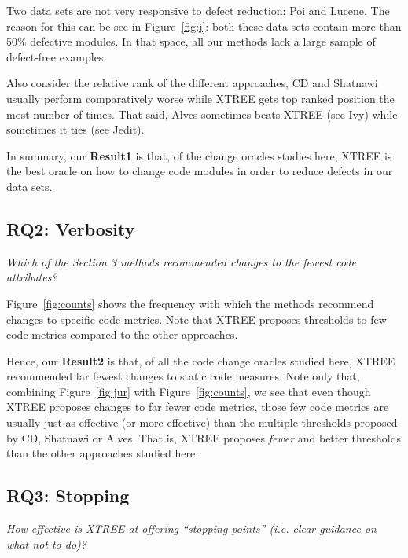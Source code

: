 \documentclass[twocolumn,5p]{elsarticle}
\newcommand{\fig}[1]{Figure~\ref{fig:#1}}
\theoremstyle{break}
\begin{document}
\begin{itemize}
		Two data sets are not very responsive to defect reduction:
		Poi and Lucene. The reason for this can be see in \fig{j}:
		both these data sets contain more than 50\% defective modules.
		In that space, all our  methods lack a large sample of
		defect-free examples. 
		
		Also consider the relative
		rank of the different approaches,
		CD and Shatnawi usually  perform comparatively worse while  XTREE gets top ranked position the most
		number of times. That said, Alves sometimes beats XTREE (see Ivy)
		while sometimes it ties (see Jedit).
		
		In summary, our {\bf Result1} is  that, of the change oracles studies here,
		XTREE is the best oracle on how to change code modules in order to reduce defects in our data sets.
		
		
		
		\subsection{RQ2: Verbosity}
		
		{\em Which of the Section 3 methods recommended changes to the fewest code attributes?}
		
		\fig{counts} shows the frequency with which the methods
		recommend changes to specific code metrics.
		Note that XTREE proposes thresholds to
		few code metrics compared to the other approaches. 
		
		
		Hence, our {\bf Result2} is that, of all the code change oracles studied here, XTREE recommended far fewest changes to static code measures.
		Note only that,   combining  \fig{jur} with \fig{counts}, we   see that
		even though XTREE proposes changes to far fewer code metrics, those few
		code metrics are usually just as effective (or
		more effective) than the multiple
		thresholds
		proposed by CD, Shatnawi or Alves.  That is, XTREE proposes
		{\em fewer} and better thresholds than the other approaches studied here.
		
		
		
		\subsection{RQ3: Stopping}
		
		{\em  How effective is XTREE at offering   ``stopping points'' (i.e. clear guidance on what not to do)?}
		

\end{itemize}
\end{document}
